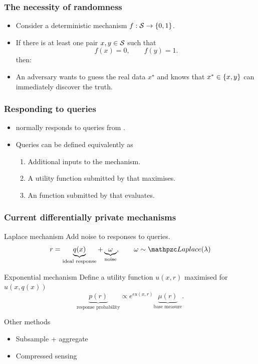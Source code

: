 \begin{frame}
  \frametitle{The necessity of randomness}
  \begin{itemize}
  \item Consider a deterministic mechanism $f : {\mathcal{S}} \to \{0,1\}$.
  \item<2-> If there is at least one pair $x, y \in {\mathcal{S}}$ such that
    \[
    f(x) = 0, \qquad f(y) = 1.
    \]
    then:
  \item<3-> An adversary \Adv{} wants to guess the real data $x^\star$ and knows that $x^* \in \left\{x, y\right\}$ can immediately discover the truth.
  \end{itemize}
\end{frame}

\begin{frame}
  \frametitle{Responding to queries}
  \begin{itemize}
  \item \Bay{} normally responds to queries from \Adv{}.
  \item Queries can be defined equivalently as 
    \begin{enumerate}
    \item Additional inputs to the mechanism.
    \item A utility function submitted by \Adv{} that \Bay{} maximises.
    \item An function submitted by \Adv{} that \Bay{} evaluates.
    \end{enumerate}
  \end{itemize}
\end{frame}

\begin{frame}
  \frametitle{Current differentially private mechanisms}
  \begin{block}{Laplace mechanism}
    Add noise to responses to queries.
    \[
    r = \underbrace{q(x)}_{\textrm{ideal response}} + \underbrace{\omega}_{\textrm{noise}}, \qquad \omega \sim \Laplace(\lambda)
    \]
  \end{block}
  \begin{block}{Exponential mechanism}
    Define a utility function $u(x,r)$ maximised for $u(x, q(x))$ 
    \[
    \underbrace{p(r)}_{\textrm{response probability}} \propto e^{\epsilon u(x,r)} \underbrace{\mu(r)}_{\textrm{base measure}}.
    \]
  \end{block}
  \begin{block}{Other methods}
    \begin{itemize}
    \item Subsample + aggregate
    \item Compressed sensing
    \end{itemize}
  \end{block}
\end{frame}

